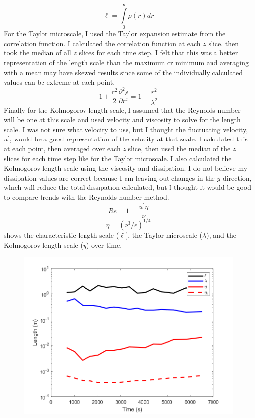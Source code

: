 \documentclass[11pt]{article}
\begin{document}
\begin{enumerate}
	\begin{equation}
		\ell = \int\limits_0^{\infty} \rho (r) dr
	\end{equation}
	For the Taylor microscale, I used the Taylor expansion estimate from the correlation function. I calculated the correlation function at each $z$ slice, then took the median of all $z$ slices for each time step. I felt that this was a better representation of the length scale than the maximum or minimum and averaging with a mean may have skewed results since some of the individually calculated values can be extreme at each point.
	\begin{equation}
		1+\frac{r^2}{2}\frac{\partial^2\rho}{\partial r^2} = 1-\frac{r^2}{\lambda^2}
	\end{equation}
	Finally for the Kolmogorov length scale, I assumed that the Reynolds number will be one at this scale and used velocity and viscosity to solve for the length scale. I was not sure what velocity to use, but I thought the fluctuating velocity, $u^{\prime}$, would be a good representation of the velocity at that scale. I calculated this at each point, then averaged over each $z$ slice, then used the median of the $z$ slices for each time step like for the Taylor microscale. I also calculated the Kolmogorov length scale using the viscosity and dissipation. I do not believe my dissipation values are correct because I am leaving out changes in the $y$ direction, which will reduce the total dissipation calculated, but I thought it would be good to compare trends with the Reynolds number method.
	\begin{equation}
		Re = 1 = \frac{u^{\prime} \eta}{\nu}
	\end{equation}
	\begin{equation}
		\eta = \left( \nu^3 / \epsilon \right)^{1/4}
	\end{equation}
	 shows the characteristic length scale ($\ell$), the Taylor microscale ($\lambda$), and the Kolmogorov length scale ($\eta$) over time.
	\begin{figure}[htbp]
		\centering
		\includegraphics[width=\textwidth]{1-plots/char_length_comp_plot.png}

\end{figure}
\end{enumerate}
\end{document}
